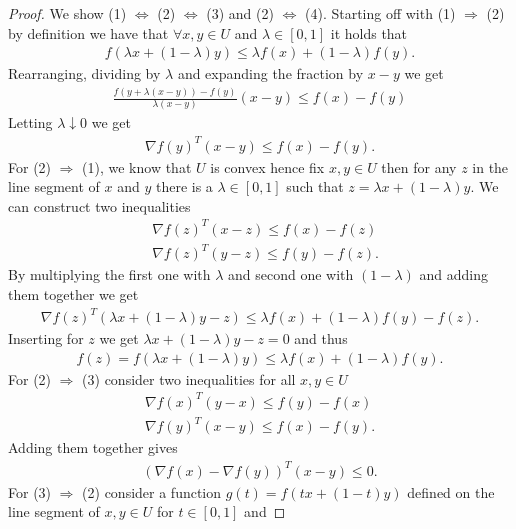 \begin{proof}
    We show (1) $\Leftrightarrow$ (2) $\Leftrightarrow$ (3) and (2)
    $\Leftrightarrow$ (4). Starting off with (1) $\Rightarrow$ (2) by definition
    we have that $\forall x, y \in U$ and $\lambda \in [0, 1]$ it holds that
    \begin{align}
        f(\lambda x + (1-\lambda)y) \le \lambda f(x) + (1-\lambda)f(y).
    \end{align}
    Rearranging, dividing by $\lambda$ and expanding the fraction by $x-y$ we
    get
    \begin{align}
        \frac{f(y+\lambda(x-y)) - f(y)}{\lambda (x-y)}(x-y) \le f(x) - f(y)
    \end{align}
    Letting $\lambda \downarrow 0$ we get
    \begin{align}
        \nabla f(y)^{T} (x-y) \le f(x) - f(y).
    \end{align}
For (2) $\Rightarrow$ (1), we know that $U$ is convex hence fix $x, y \in U$
then for any $z$ in the line segment of $x$ and $y$ there is a $\lambda \in
[0,1]$ such that $z = \lambda x + (1-\lambda)y$. We can construct two
inequalities
\begin{align}
    &\nabla f(z)^{T} (x-z) \le f(x) - f(z) \\
    &\nabla f(z)^{T} (y-z) \le f(y) - f(z).
\end{align}
By multiplying the first one with $\lambda$ and second one with $(1-\lambda)$
and adding them together we get
\begin{align}
    \nabla f(z)^{T} (\lambda x + (1-\lambda)y - z) \le \lambda f(x) +
    (1-\lambda)f(y) - f(z).
\end{align}
Inserting for $z$ we get $\lambda x+ (1-\lambda)y - z =0$ and thus
\begin{align}
    f(z) = f(\lambda x + (1-\lambda)y) \le \lambda f(x) + (1-\lambda)f(y).
\end{align}
For (2) $\Rightarrow$ (3) consider two inequalities for all $x, y \in U$
\begin{align}
    \nabla f(x)^{T} (y-x) \le f(y) - f(x) \\
    \nabla f(y)^{T} (x-y) \le f(x) - f(y).
\end{align}
Adding them together gives
\begin{align}
    (\nabla f(x) - \nabla f(y))^{T} (x-y) \le 0 .
\end{align}
For (3) $\Rightarrow$ (2) consider a function $g(t) = f(t x + (1-t)y)$
defined on the line segment of $x, y \in U$ for $t \in [0, 1]$ and

\end{proof}
